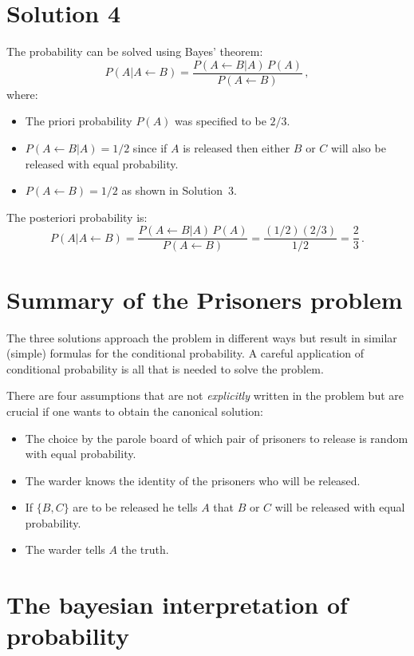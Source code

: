 \documentclass[11pt,a4paper]{article}
\begin{document}

\section{Solution 4}

The probability can be solved using Bayes' theorem:
\[
P(A|A\leftarrow B)= \frac{P(A\leftarrow B|A)\,P(A)}{P(A\leftarrow B)}\,,
\]
where:
\begin{itemize}
\item The priori probability $P(A)$ was specified to be $2/3$.
\item $P(A\leftarrow B|A)=1/2$ since if $A$ is released then either $B$ or $C$ will also be released with equal probability.
\item $P(A\leftarrow B)=1/2$ as shown in Solution~3.
\end{itemize}
The posteriori probability is:
\[
P(A|A\leftarrow B)= \frac{P(A\leftarrow B|A)\,P(A)}{P(A\leftarrow B)} = \frac{(1/2)(2/3)}{1/2}=\frac{2}{3}\,.
\]

\section*{Summary of the Prisoners problem}

The three solutions approach the problem in different ways but result in similar (simple) formulas for the conditional probability. A careful application of conditional probability is all that is needed to solve the problem.

There are four assumptions that are not \emph{explicitly} written in the problem but are crucial if one wants to obtain the canonical solution:
\begin{itemize}
\item The choice by the parole board of which pair of prisoners to release is random with equal probability.
\item The warder knows the identity of the prisoners who will be released.
\item If $\{B,C\}$ are to be released he tells $A$ that $B$ or $C$ will be released with equal probability.
\item The warder tells $A$ the truth.
\end{itemize}


\section{The bayesian interpretation of probability}
\end{document}
